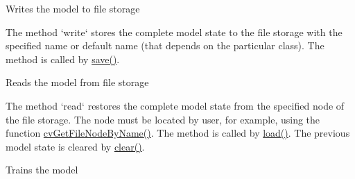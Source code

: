 Writes the model to file storage


The method `write` stores the complete model state to the file storage with the specified name or default name (that depends on the particular class). The method is called by \href{#CvStatModel.3A.3Asave}{save()}.



Reads the model from file storage


The method `read` restores the complete model state from the specified node of the file storage. The node must be located by user, for example, using the function \href{opencvref_cxcore.htm#decl_cvGetFileNodeByName}{cvGetFileNodeByName()}. The method is called by \href{#CvStatModel_load}{load()}.
\newline
\newline
The previous model state is cleared by \href{#CvStatModel_clear}{clear()}.



Trains the model


